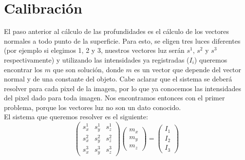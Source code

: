 

\section{Calibración}

El paso anterior al cálculo de las profundidades es el cálculo de los vectores normales a todo punto de la superficie. Para esto, se eligen tres luces diferentes (por ejemplo si elegimos 1, 2 y 3, nuestros vectores luz serán $s^{1}$, $s^{2}$ y $s^{3}$ respectivamente) y utilizando las intensidades ya registradas ($I_i$) queremos encontrar los $m$ que son solución, donde $m$ es un vector que depende del vector normal y de una constante del objeto. Cabe aclarar que el sistema se deberá resolver para cada pixel de la imagen, por lo que ya conocemos las intensidades del pixel dado para toda imagen. Nos encontramos entonces con el primer problema, porque los vectores luz no son un dato conocido. \\

El sistema que queremos resolver es el siguiente: \\

\[
\begin{pmatrix}
    s_{x}^{1} & s_{y}^{1} & s_{z}^{1} \\
    s_{x}^{2} & s_{y}^{2} & s_{z}^{2} \\
    s_{x}^{3} & s_{y}^{3} & s_{z}^{3}
\end{pmatrix}
\begin{pmatrix}
    m_{x} \\
    m_{y} \\
    m_{z}
\end{pmatrix}
=
\begin{pmatrix}
    I_{1} \\
    I_{2} \\
    I_{3}
\end{pmatrix}
\]

